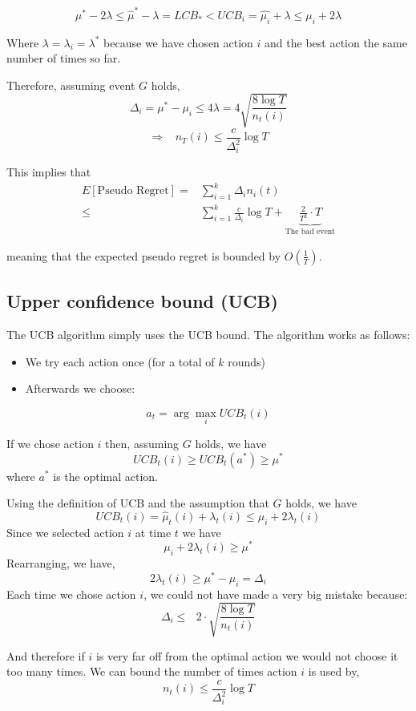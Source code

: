 \[
\mu^{*}-2\lambda\le\hat{\mu}^{*}-\lambda=LCB_{*}<UCB_{i}=\hat{\mu_{i}}+\lambda\leq\mu_{i}+2\lambda
\]

Where $\lambda=\lambda_{i}=\lambda^{*}$ because we have chosen
action $i$ and the best action the same number of times so far.

Therefore, assuming event $G$ holds,
\[
\Delta_{i}=\mu^{*}-\mu_{i}\le4\lambda=4\sqrt{\frac{8\log
T}{n_{t}(i)}}
\]
\[
\Rightarrow\;\;\; n_{T}(i)\le\frac{c}{\Delta_{i}^{2}}\log T
\]

This implies that
\begin{align*}
E\left[\text{Pseudo Regret}\right]  = &  \sum_{i=1}^{k}\Delta_{i}n_{i}(t)\\
  \le &  \sum_{i=1}^{k}\frac{c}{\Delta_{i}}\log T
  +\underbrace{\frac{2}{T^{2}}\cdot T}_{\text{The bad event}}
\end{align*}

meaning that the expected pseudo regret is bounded by $O\left(\frac{1}{T}\right)$.

\subsection{Upper confidence bound (UCB)}

The UCB algorithm simply uses the UCB bound. The algorithm works as
follows:
\begin{itemize}
\item We try each action once (for a total of $k$ rounds)
\item Afterwards we choose:
\end{itemize}
\[
a_{t}=\arg\max_{i}UCB_t(i)
\]

If we chose action $i$ then, assuming $G$ holds, we have
\[
UCB_{t}(i)  \ge  UCB_t(a^*)\geq\mu^{*}
\]
where $a^*$ is the optimal action.

Using the definition of UCB and the assumption that $G$ holds, we
have
\[
UCB_t(i)=\hat{\mu}_{t}(i)+\lambda_{t}(i)\le\mu_{i}+2\lambda_{t}(i)
\]
Since we selected action $i$ at time $t$ we have
\[
\mu_{i}+2\lambda_{t}(i)\ge\mu^{*}
\]
Rearranging, we have,
\[
2\lambda_t(i)\ge\mu^{*}-\mu_{i}=\Delta_{i}
\]
Each time we chose action $i$, we could not have made a very big
mistake because:
\[
\Delta_{i}\leq\text{ }2\cdot\sqrt{\frac{8\log T}{n_{t}(i)}}
\]

And therefore if $i$ is very far off from the optimal action we
would not choose it too many times. We can bound the number of times
action $i$ is used by,
\[
n_{t}(i)\leq\frac{c}{\Delta_{i}^{2}}\log T
\]

